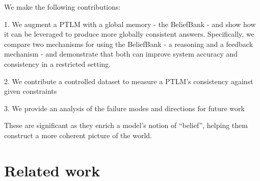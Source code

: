 \documentclass[11pt]{article}
\newcommand{\nk}[1]{\textcolor{green}{Nora: #1}}
\newcommand{\eat}[1]{}
\newcommand{\red}[1]{\textcolor{red}{#1}}
\newenvironment{enu}{                   %
     \parskip 0cm \begin{list}{}{\parsep 0cm \itemsep 0cm \topsep 0cm}}{
       \end{list}} %
\begin{document}
We make the following contributions:
\begin{enu}
\item[1.] We augment a PTLM with a global memory - the BeliefBank -
and show how it can be leveraged to produce more globally consistent answers.
Specifically, we compare two mechanisms for using the BeliefBank - a reasoning and a feedback mechanism - 
and demonstrate that both can improve system accuracy and consistency in a restricted setting.
\item[2.] We contribute a controlled dataset to measure a PTLM's consistency against given constraints
\item[3.] We provide an analysis of the failure modes and directions for future work
\end{enu}
These are significant as they enrich a model's notion of ``belief'',
helping them construct a more coherent picture of the world. 

\eat{
PEC: Some of these are more activities (features) rather than contributions (benefits). e.g., Proposing
an architecture isn't a contribution per se - the contribution is showing a new architecture is beneficial.

We make the following contributions: i) We propose to augment a PTLM with a global memory - the BeliefBank to track a PTLM's "beliefs" ii) We compare two mechanisms of exploiting this BeliefBank - a reasoning and a feedback mechanism iii) We contribute a controlled dataset to measure a PTLM's consistency to given constraints. iv) We show that PLMs struggle with mutual exclusive constraints. v) Finally, we show that both mechanisms improve both overall accuracy and consistency on that dataset.
}

\section{Related work \label{related-work}}

\end{document}
